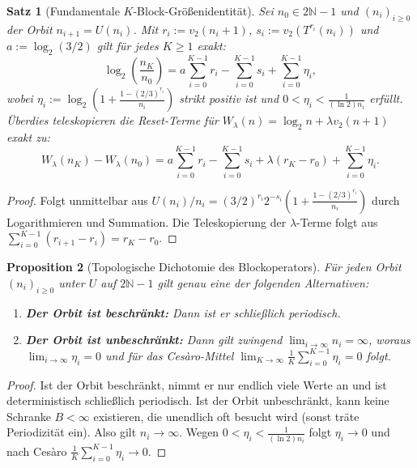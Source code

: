 \documentclass[11pt,reqno]{amsart}
\newtheorem{theorem}{Satz}[section]
\newtheorem{proposition}[theorem]{Proposition}
\theoremstyle{definition}
\theoremstyle{remark}
\numberwithin{equation}{section}
\begin{document}
\begin{theorem}[Fundamentale $K$-Block-Gr\"o\ss{}enidentit\"at]
\label{thm:block_size_identity}
Sei $n_0 \in 2\mathbb{N}-1$ und $(n_i)_{i \ge 0}$ der Orbit $n_{i+1} = U(n_i)$. Mit $r_i := v_2(n_i + 1)$, $s_i := v_2(T^{r_i}(n_i))$ und $a := \log_2(3/2)$ gilt f\"ur jedes $K \ge 1$ exakt:
\begin{equation}
\log_2\left(\frac{n_K}{n_0}\right) = a \sum_{i=0}^{K-1} r_i - \sum_{i=0}^{K-1} s_i + \sum_{i=0}^{K-1} \eta_i,
\label{eq:master_block_identity}
\end{equation}
wobei $\eta_i := \log_2\left( 1 + \frac{1 - (2/3)^{r_i}}{n_i} \right)$ strikt positiv ist und $0 < \eta_i < \frac{1}{(\ln 2) n_i}$ erf\"ullt. 
\"Uberdies teleskopieren die Reset-Terme f\"ur $W_\lambda(n) = \log_2 n + \lambda v_2(n+1)$ exakt zu:
\begin{equation}
W_\lambda(n_K) - W_\lambda(n_0) = a \sum_{i=0}^{K-1} r_i - \sum_{i=0}^{K-1} s_i + \lambda(r_K - r_0) + \sum_{i=0}^{K-1} \eta_i.
\end{equation}
\end{theorem}

\begin{proof}
Folgt unmittelbar aus $U(n_i)/n_i = (3/2)^{r_i} 2^{-s_i} (1 + \frac{1-(2/3)^{r_i}}{n_i})$ durch Logarithmieren und Summation. Die Teleskopierung der $\lambda$-Terme folgt aus $\sum_{i=0}^{K-1} (r_{i+1} - r_i) = r_K - r_0$.
\end{proof}

\begin{proposition}[Topologische Dichotomie des Blockoperators]
\label{prop:block_dichotomy}
F\"ur jeden Orbit $(n_i)_{i \ge 0}$ unter $U$ auf $2\mathbb{N}-1$ gilt genau eine der folgenden Alternativen:
\begin{enumerate}
\item \textbf{Der Orbit ist beschr\"ankt:} Dann ist er schlie\ss{}lich periodisch.
\item \textbf{Der Orbit ist unbeschr\"ankt:} Dann gilt zwingend $\lim_{i \to \infty} n_i = \infty$, woraus $\lim_{i \to \infty} \eta_i = 0$ und f\"ur das Ces\`aro-Mittel $\lim_{K \to \infty} \frac{1}{K} \sum_{i=0}^{K-1} \eta_i = 0$ folgt.
\end{enumerate}
\end{proposition}

\begin{proof}
Ist der Orbit beschr\"ankt, nimmt er nur endlich viele Werte an und ist deterministisch schlie\ss{}lich periodisch.
Ist der Orbit unbeschr\"ankt, kann keine Schranke $B < \infty$ existieren, die unendlich oft besucht wird (sonst tr\"ate Periodizit\"at ein). Also gilt $n_i \to \infty$. Wegen $0 < \eta_i < \frac{1}{(\ln 2) n_i}$ folgt $\eta_i \to 0$ und nach Ces\`aro $\frac{1}{K} \sum_{i=0}^{K-1} \eta_i \to 0$.
\end{proof}
\end{document}
